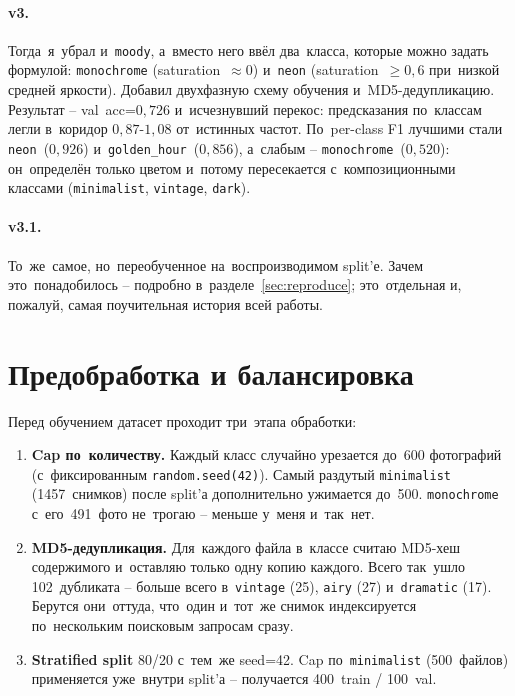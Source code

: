 \documentclass[a4paper,12pt]{diplom}
\renewcommand{\geq}{\geqslant}
\begin{document}
\paragraph{v3.} Тогда~я~убрал и~\texttt{moody}, а~вместо него ввёл два~класса, которые можно задать формулой: \texttt{monochrome} (saturation~$\approx 0$) и~\texttt{neon} (saturation~$\geq 0{,}6$ при~низкой средней яркости). Добавил двухфазную схему обучения и~MD5-дедупликацию. Результат -- val~acc=$0{,}726$ и~исчезнувший перекос: предсказания по~классам легли в~коридор $0{,}87$-$1{,}08$ от~истинных частот. По~per-class F1 лучшими стали \texttt{neon}~($0{,}926$) и~\texttt{golden\_hour}~($0{,}856$), а~слабым -- \texttt{monochrome}~($0{,}520$): он~определён только цветом и~потому пересекается с~композиционными классами (\texttt{minimalist}, \texttt{vintage}, \texttt{dark}).

\paragraph{v3.1.} То~же~самое, но~переобученное на~воспроизводимом split'е. Зачем это~понадобилось -- подробно в~разделе~\ref{sec:reproduce}; это~отдельная и, пожалуй, самая поучительная история всей работы.

\section{Предобработка и балансировка}
\label{sec:preprocess}

Перед обучением датасет проходит три~этапа обработки:

\begin{enumerate}[label=\arabic{enumi})]
\item \textbf{Cap по~количеству.} Каждый класс случайно урезается до~600 фотографий (с~фиксированным \texttt{random.seed(42)}). Самый раздутый \texttt{minimalist} (1457~снимков) после split'а дополнительно ужимается до~500. \texttt{monochrome} с~его~491~фото не~трогаю -- меньше у~меня и~так~нет.
\item \textbf{MD5-дедупликация.} Для~каждого файла в~классе считаю MD5-хеш содержимого и~оставляю только одну копию каждого. Всего так~ушло 102~дубликата -- больше всего в~\texttt{vintage} (25), \texttt{airy} (27) и~\texttt{dramatic} (17). Берутся они~оттуда, что~один и~тот~же снимок индексируется по~нескольким поисковым запросам сразу.
\item \textbf{Stratified split} 80/20 с~тем~же seed=42. Cap по~\texttt{minimalist} (500~файлов) применяется уже~внутри split'а -- получается 400~train / 100~val.
\end{enumerate}
\end{document}
